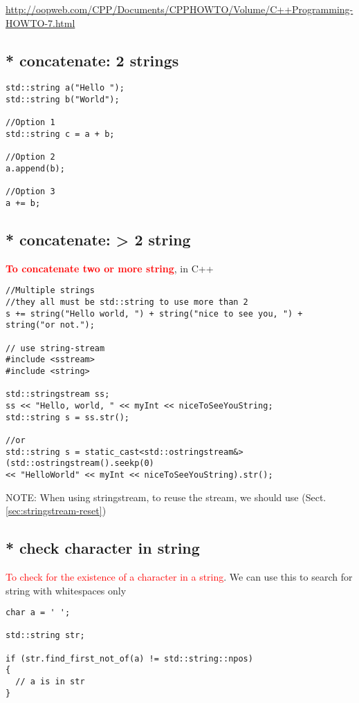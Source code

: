 \url{http://oopweb.com/CPP/Documents/CPPHOWTO/Volume/C++Programming-HOWTO-7.html}

\subsection{* concatenate: 2 strings}

\begin{verbatim}
std::string a("Hello ");
std::string b("World");

//Option 1
std::string c = a + b;

//Option 2
a.append(b);

//Option 3
a += b;
\end{verbatim}

\subsection{* concatenate: > 2 string}

\textcolor{red}{\bf To concatenate two or more string}, in C++
\begin{verbatim}
//Multiple strings
//they all must be std::string to use more than 2
s += string("Hello world, ") + string("nice to see you, ") + string("or not.");

// use string-stream
#include <sstream>
#include <string>

std::stringstream ss;
ss << "Hello, world, " << myInt << niceToSeeYouString;
std::string s = ss.str();

//or
std::string s = static_cast<std::ostringstream&>(std::ostringstream().seekp(0)
<< "HelloWorld" << myInt << niceToSeeYouString).str();
\end{verbatim}

NOTE: When using stringstream, to reuse the stream, we should use
(Sect.\ref{sec:stringstream-reset})

\subsection{* check character in string}

\textcolor{red}{To check for the existence of a character in a string}. We can
use this to search for string with whitespaces only
\begin{verbatim}
char a = ' ';

std::string str;

if (str.find_first_not_of(a) != std::string::npos) 
{
  // a is in str
}
\end{verbatim}

